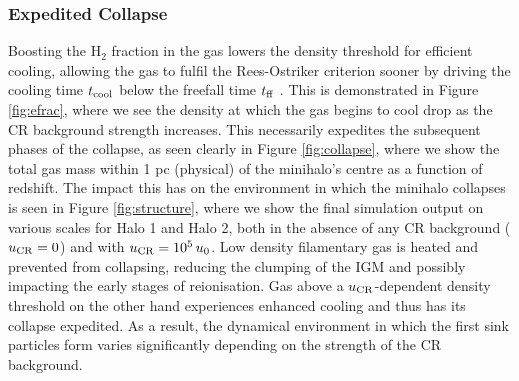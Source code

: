 \documentclass[usenatbib]{mn2e}
\newcommand{\htwo}{\mathrm{H}_2}
\newcommand{\ucr}{{u}_{\rm \small CR}}
\begin{document}
\subsubsection{Expedited Collapse}
\label{sec:expedited_collapse}
Boosting the $\htwo$ fraction in the gas lowers the density threshold for efficient cooling, allowing the gas to fulfil the Rees-Ostriker criterion sooner by driving the cooling time $t_{\rm \small cool}$ below the freefall time $t_{\rm \small ff}$ \citep{ReesOstriker1977}.
This is demonstrated in Figure \ref{fig:efrac}, where we see the density at which the gas begins to cool drop as the CR background strength increases.  
This necessarily expedites the subsequent phases of the collapse, as seen clearly in Figure \ref{fig:collapse}, where we show the total gas mass within 1 pc (physical) of the minihalo's centre as a function of redshift.  
The impact this has on the environment in which the minihalo collapses is seen in Figure \ref{fig:structure}, where we show the final simulation output on various scales for Halo 1 and Halo 2, both in the absence of any CR background ($\ucr=0$) and with $\ucr=10^5\,u_0$. 
Low density filamentary gas is heated and prevented from collapsing, reducing the clumping of the IGM and possibly impacting the early stages of reionisation.
Gas above a $\ucr$-dependent density threshold on the other hand experiences enhanced cooling and thus has its collapse expedited.
As a result, the dynamical environment in which the first sink particles form varies significantly depending on the strength of the CR background.
\end{document}
